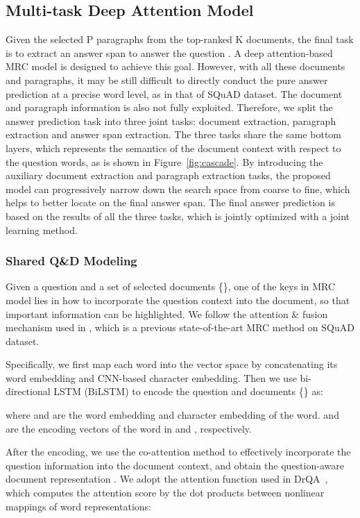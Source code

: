 \documentclass[letterpaper]{article} \usepackage{aaai19}  \usepackage{graphicx}
\begin{document}
\subsection{Multi-task Deep Attention Model}
Given the selected P paragraphs from the top-ranked K documents, the final task is to extract an answer span to answer the question . A deep attention-based MRC model is designed to achieve this goal. However, with all these documents and paragraphs, it may be still difficult to directly conduct the pure answer prediction at a precise word level, as in that of SQuAD dataset. The document and paragraph information is also not fully exploited. Therefore, we split the answer prediction task into three joint tasks: document extraction, paragraph extraction and answer span extraction. The three tasks share the same bottom layers, which represents the semantics of the document context with respect to the question words, as is shown in Figure~\ref{fig:cascade}. By introducing the auxiliary document extraction and paragraph extraction tasks, the proposed model can progressively narrow down the search space from coarse to fine, which helps to better locate on the final answer span. The final answer prediction is based on the results of all the three tasks, which is jointly optimized with a joint learning method. 

\subsubsection{Shared Q\&D Modeling}
Given a question  and a set of selected documents \{\}, one of the keys in MRC model lies in how to incorporate the question context into the document, so that important information can be highlighted. We follow the attention \& fusion mechanism used in \cite{wang2018alibaba}, which is a previous state-of-the-art MRC method on SQuAD dataset.  

Specifically, we first map each word into the vector space by concatenating its word embedding and CNN-based character embedding. Then we use bi-directional LSTM (BiLSTM) to encode the question  and documents \{\} as:

where  and  are the word embedding and character embedding of the  word.  and  are the encoding vectors of the  word in  and , respectively.

After the encoding, we use the co-attention method to effectively incorporate the question information into the document context, and obtain the question-aware document representation . We adopt the attention function used in DrQA~\cite{chen2017reading}, which computes the attention score  by the dot products between nonlinear mappings of word representations:
\end{document}
